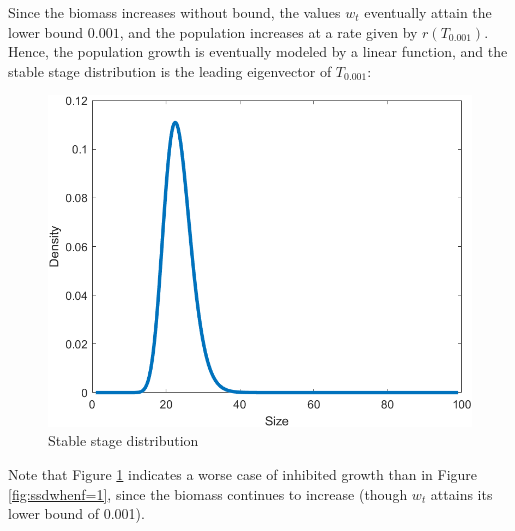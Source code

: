 Since the biomass increases without bound, the values $w_t$ eventually attain the lower bound $0.001$, and the population increases at a rate given by $r(T_{0.001})$. Hence, the population growth is eventually modeled by a linear function, and the stable stage distribution is the leading eigenvector of $T_{0.001}$:

\begin{figure}[H]
	\centering
	\includegraphics[width=0.7\linewidth]{Images/F=1000/ssd_when_f=1000}
	\caption{Stable stage distribution}
	\label{fig:ssdwhenf=1000}
\end{figure}

Note that Figure \ref{fig:ssdwhenf=1000} indicates a worse case of inhibited growth than in Figure \ref{fig:ssdwhenf=1}, since the biomass continues to increase (though $w_t$ attains its lower bound of 0.001).













